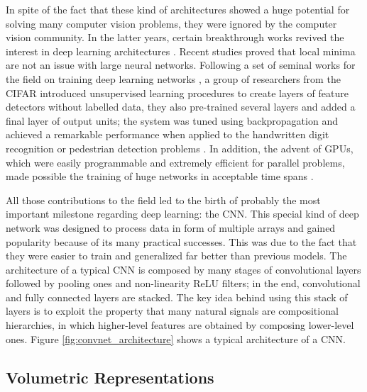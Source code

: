 In spite of the fact that these kind of architectures showed a huge potential for solving many computer vision problems, they were ignored by the computer vision community. In the latter years, certain breakthrough works revived the interest in deep learning architectures \cite{Lecun2015}. Recent studies proved that local minima are not an issue with large neural networks. Following a set of seminal works for the field on training deep learning networks \cite{Hinton2006}\cite{Bengio2007}, a group of researchers from the \ac{CIFAR} introduced unsupervised learning procedures to create layers of feature detectors without labelled data, they also pre-trained several layers and added a final layer of output units; the system was tuned using backpropagation and achieved a remarkable performance when applied to the handwritten digit recognition or pedestrian detection problems \cite{Sermanet2013}. In addition, the advent of \acp{GPU}, which were easily programmable and extremely efficient for parallel problems, made possible the training of huge networks in acceptable time spans \cite{Raina2009}.

All those contributions to the field led to the birth of probably the most important milestone regarding deep learning: the \acf{CNN}. This special kind of deep network was designed to process data in form of multiple arrays and gained popularity because of its many practical successes. This was due to the fact that they were easier to train and generalized far better than previous models. The architecture of a typical \ac{CNN} is composed by many stages of convolutional layers followed by pooling ones and non-linearity \ac{ReLU} filters; in the end, convolutional and fully connected layers are stacked. The key idea behind using this stack of layers is to exploit the property that many natural signals are compositional hierarchies, in which higher-level features are obtained by composing lower-level ones. Figure \ref{fig:convnet_architecture} shows a typical architecture of a \ac{CNN}.

\subsection{Volumetric Representations}
\label{cha:objrecog:sec:relatedworks:subsec:representations}

